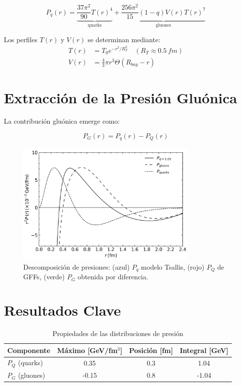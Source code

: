 \begin{equation}
P_q(r) = \underbrace{\frac{37\pi^2}{90}T(r)^4}_{\text{quarks}} + \underbrace{\frac{256\pi^2}{15}(1-q)V(r)T(r)^7}_{\text{gluones}}
\end{equation}

\begin{remark}
Los perfiles $T(r)$ y $V(r)$ se determinan mediante:
\begin{align}
T(r) &= T_0 e^{-r^2/R_T^2} \quad (R_T \approx \qty{0.5}{fm}) \\
V(r) &= \frac{4}{3}\pi r^3 \Theta(R_{bag} - r)
\end{align}
\end{remark}

\section{Extracción de la Presión Gluónica}
La contribución gluónica emerge como:

\begin{equation}
P_G(r) = P_q(r) - P_Q(r)
\end{equation}

\begin{figure}[h]
    \centering
    \includegraphics[width=0.8\textwidth]{./Images/PressureDistributionsTot-Q-G.png}
    \caption{Descomposición de presiones: (azul) $P_q$ modelo Tsallis, (rojo) $P_Q$ de GFFs, (verde) $P_G$ obtenida por diferencia.}
    \label{fig:PressureDecomp}
\end{figure}

\section{Resultados Clave}
\begin{table}[h]
    \centering
    \caption{Propiedades de las distribuciones de presión}
    \begin{tabular}{lccc}
    \toprule
    Componente & Máximo [GeV/fm$^3$] & Posición [fm] & Integral [GeV] \\
    \midrule
    $P_Q$ (quarks) & 0.35 & 0.3 & 1.04 \\
    $P_G$ (gluones) & -0.15 & 0.8 & -1.04 \\
    \bottomrule
    \end{tabular}
    \label{tab:PressureResults}
\end{table}

